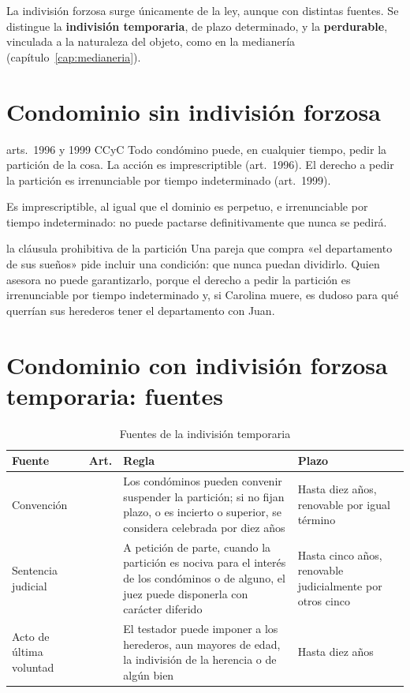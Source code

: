 \documentclass[12pt,oneside]{book}
\begin{document}
La indivisión forzosa surge únicamente de la ley, aunque con distintas fuentes. Se distingue la \textbf{indivisión temporaria}, de plazo determinado, y la \textbf{perdurable}, vinculada a la naturaleza del objeto, como en la medianería (capítulo~\ref{cap:medianeria}).

\section{Condominio sin indivisión forzosa}

\begin{regla}{arts.~1996 y 1999 CCyC}
Todo condómino puede, en cualquier tiempo, pedir la partición de la cosa. La acción es imprescriptible (art.~1996). El derecho a pedir la partición es irrenunciable por tiempo indeterminado (art.~1999).
\end{regla}

Es imprescriptible, al igual que el dominio es perpetuo, e irrenunciable por tiempo indeterminado: no puede pactarse definitivamente que nunca se pedirá.

\begin{ejemplo}{la cláusula prohibitiva de la partición}
Una pareja que compra «el departamento de sus sueños» pide incluir una condición: que nunca puedan dividirlo. Quien asesora no puede garantizarlo, porque el derecho a pedir la partición es irrenunciable por tiempo indeterminado y, si Carolina muere, es dudoso para qué querrían sus herederos tener el departamento con Juan.
\end{ejemplo}

\section{Condominio con indivisión forzosa temporaria: fuentes}

\begin{table}[H]
\centering
\small
\begin{tabularx}{\textwidth}{>{\raggedright\arraybackslash}p{}>{\raggedright\arraybackslash}p{}>{\raggedright\arraybackslash}X>{\raggedright\arraybackslash}p{}}
\toprule
\textbf{Fuente} & \textbf{Art.} & \textbf{Regla} & \textbf{Plazo} \\
\midrule
Convención & 2000 & Los condóminos pueden convenir suspender la partición; si no fijan plazo, o es incierto o superior, se considera celebrada por diez años & Hasta diez años, renovable por igual término \\
Sentencia judicial & 2001 & A petición de parte, cuando la partición es nociva para el interés de los condóminos o de alguno, el juez puede disponerla con carácter diferido & Hasta cinco años, renovable judicialmente por otros cinco \\
Acto de última voluntad & 2330 & El testador puede imponer a los herederos, aun mayores de edad, la indivisión de la herencia o de algún bien & Hasta diez años \\
\bottomrule
\end{tabularx}
\caption{Fuentes de la indivisión temporaria}
\end{table}
\end{document}

